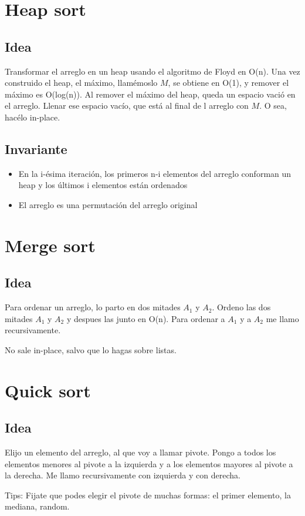 \documentclass[a4paper]{article}
\begin{document}
\section{Heap sort}
    \subsection{Idea}
        Transformar el arreglo en un heap usando el algoritmo de Floyd en O(n). Una vez construido el heap, el máximo, llamémoslo $M$, 
        se obtiene en O(1), y remover el máximo es O(log(n)). Al remover el máximo del heap, queda un espacio vació en el arreglo. 
        Llenar ese espacio vacío, que está al final de l arreglo con $M$.
        O sea, hacélo in-place.
    
    \subsection{Invariante}
        \begin{itemize}
            \item En la i-ésima iteración, los primeros n-i elementos del arreglo conforman un heap y los últimos i elementos 
                  están ordenados

            \item El arreglo es una permutación del arreglo original
        \end{itemize}
        

\section{Merge sort}
    \subsection{Idea}
        Para ordenar un arreglo, lo parto en dos mitades $A_1$ y $A_2$. Ordeno las dos mitades $A_1$ y $A_2$ y despues las junto en O(n).
        Para ordenar a $A_1$ y a $A_2$ me llamo recursivamente.

        No sale in-place, salvo que lo hagas sobre listas.

\section{Quick sort}
    \subsection{Idea}
        Elijo un elemento del arreglo, al que voy a llamar pivote. Pongo a todos los elementos menores al pivote a la izquierda 
        y a los elementos mayores al pivote a la derecha.
        Me llamo recursivamente con izquierda y con derecha.

        Tips: Fijate que podes elegir el pivote de muchas formas: el primer elemento, la mediana, random.
\end{document}
